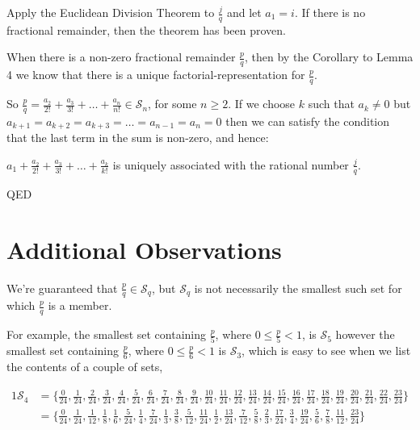 \documentclass{article}
\begin{document}
Apply the Euclidean Division Theorem to \(\frac{j}{q}\) and let \(a_1 = i\). If there is no fractional remainder, then
the theorem has been proven.

When there is a non-zero fractional remainder \(\frac{p}{q}\), then 
by the Corollary to Lemma 4 we know that there is a
unique factorial-representation for \(\frac{p}{q}\).

So \(\frac{p}{q} = \frac{a_2}{2!} + \frac{a_3}{3!} + \dots{} + \frac{a_n}{n!} \in \mathcal{S}_n\), for some
\(n \ge{} 2\).
If we choose \(k\) such that \(a_k \ne{} 0 \) but \(a_{k+1} =
a_{k+2} =
a_{k+3} =
\dots{} =
a_{n-1} =
a_{n} = 0\) then we can satisfy the condition that the last term in the sum is non-zero, and hence:

\(a_1 + \frac{a_2}{2!} + \frac{a_3}{3!} + \dots{} + \frac{a_k}{k!}\)
is uniquely associated with the rational number \(\frac{j}{q}\).

\hspace*{\fill}QED

\break
\section*{Additional Observations}

We're guaranteed that \(\frac{p}{q} \in{} \mathcal{S}_q\), but \(\mathcal{S}_q\) is not necessarily 
the smallest such set for which \(\frac{p}{q}\) is a member.

For example,
the smallest set containing \(\frac{p}{5}\), where \(0 \le{} \frac{p}{5} < 1\), is \(\mathcal{S}_5\)
however
the smallest set containing \(\frac{p}{6}\), where \(0 \le{} \frac{p}{6} < 1\) is \(\mathcal{S}_3\),
which is easy to see when we list the contents of a couple of sets,

{\footnotesize
\bgroup                                  %
\setlength{\abovedisplayskip}{0pt}
\begin{alignat*}{1}
\mathcal{S}_4 &= \{
\frac{ 0}{24},
\frac{ 1}{24},
\frac{ 2}{24},
\frac{ 3}{24},
\frac{ 4}{24},
\frac{ 5}{24},
\frac{ 6}{24},
\frac{ 7}{24},
\frac{ 8}{24},
\frac{ 9}{24},
\frac{10}{24},
\frac{11}{24},
\frac{12}{24},
\frac{13}{24},
\frac{14}{24},
\frac{15}{24},
\frac{16}{24},
\frac{17}{24},
\frac{18}{24},
\frac{19}{24},
\frac{20}{24},
\frac{21}{24},
\frac{22}{24},
\frac{23}{24}
\} \\
&= \{
\frac{ 0}{24},
\frac{ 1}{24},
\frac{ 1}{12},
\frac{ 1}{ 8},
\frac{ 1}{ 6},
\frac{ 5}{24},
\frac{ 1}{ 4},
\frac{ 7}{24},
\frac{ 1}{ 3},
\frac{ 3}{ 8},
\frac{ 5}{12},
\frac{11}{24},
\frac{ 1}{ 2},
\frac{13}{24},
\frac{ 7}{12},
\frac{ 5}{ 8},
\frac{ 2}{ 3},
\frac{17}{24},
\frac{ 3}{ 4},
\frac{19}{24},
\frac{ 5}{ 6},
\frac{ 7}{ 8},
\frac{11}{12},
\frac{23}{24}
\}
\end{alignat*}
\egroup
}
\end{document}
